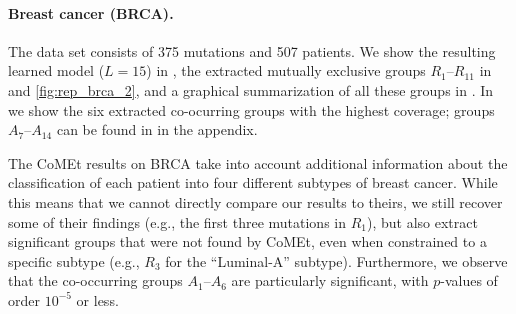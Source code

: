 \paragraph{Breast cancer (BRCA).}
The data set consists of 375 mutations and 507 patients.
We show the resulting learned \fldc{} model ($L = 15$) in , the extracted mutually exclusive groups $R_1$--$R_{11}$ in  and \ref{fig:rep_brca_2}, and a graphical summarization of all these groups in .
In  we show the six extracted co-ocurring groups with the highest coverage; groups $A_7$--$A_{14}$ can be found in  in the appendix.

The CoMEt results on BRCA take into account additional information about the classification of each patient into four different subtypes of breast cancer.
While this means that we cannot directly compare our results to theirs, we still recover some of their findings (e.g., the first three mutations in $R_1$), but also extract significant groups that were not found by CoMEt, even when constrained to a specific subtype (e.g., $R_3$ for the ``Luminal-A'' subtype).
Furthermore, we observe that the co-occurring groups $A_1$--$A_6$ are particularly significant, with $p$-values of order $10^{-5}$ or less.

